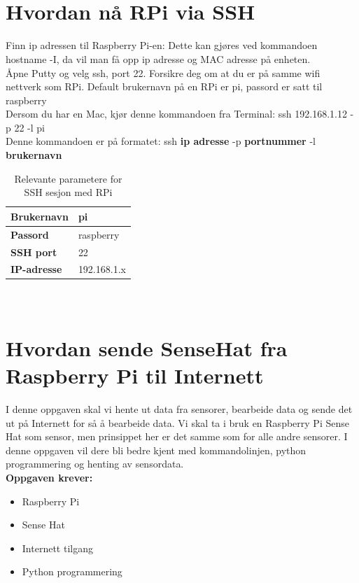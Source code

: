 \documentclass{article}
\begin{document}
\newpage
\begin{appendices}
\appendix
\section{\\Hvordan nå RPi via SSH}
Finn ip adressen til Raspberry Pi-en:
Dette kan gjøres ved kommandoen hostname -I, da vil man få opp ip adresse og MAC adresse på enheten.
\\
Åpne Putty og velg ssh, port 22.
Forsikre deg om at du er på samme wifi nettverk som RPi.
Default brukernavn på en RPi er pi, passord er satt til raspberry
\\
Dersom du har en Mac, kjør denne kommandoen fra Terminal:
ssh 192.168.1.12 -p 22 -l pi
\\
Denne kommandoen er på formatet:
ssh \textbf{ip adresse} -p \textbf{portnummer} -l \textbf{brukernavn}

\begin{table}[!ht]
	\centering
	\caption{Relevante parametere for SSH sesjon med RPi}
	\begin{tabular}{|l|l|}
		\hline
		\textbf{Brukernavn} &  pi\\ \hline
		\textbf{Passord} & raspberry \\ \hline
		\textbf{SSH port} &  22\\ \hline
		\textbf{IP-adresse} &  192.168.1.x\\ \hline
	\end{tabular}
\end{table}

\newpage 
\section{\\Hvordan sende SenseHat fra Raspberry Pi til Internett}
I denne oppgaven skal vi hente ut data fra sensorer, bearbeide data og sende det ut på Internett for så å bearbeide data. Vi skal ta i bruk en Raspberry Pi Sense Hat som sensor, men prinsippet her er det samme som for alle andre sensorer. I denne oppgaven vil dere bli bedre kjent med kommandolinjen, python programmering og henting av sensordata.
\\

\textbf{Oppgaven krever:}
\begin{itemize}
	\item Raspberry Pi
	\item Sense Hat
	\item Internett tilgang
	\item Python programmering
\end{itemize}



\end{appendices}
\end{document}

